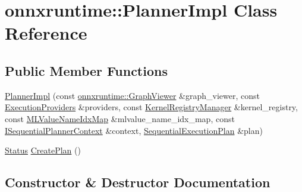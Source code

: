 \hypertarget{classonnxruntime_1_1PlannerImpl}{}\section{onnxruntime\+:\+:Planner\+Impl Class Reference}
\label{classonnxruntime_1_1PlannerImpl}
\subsection*{Public Member Functions}
\begin{DoxyCompactItemize}
\item 
\mbox{\hyperlink{classonnxruntime_1_1PlannerImpl_a1cde7a30b6a831d75664ca0908ac2beb}{Planner\+Impl}} (const \mbox{\hyperlink{classonnxruntime_1_1GraphViewer}{onnxruntime\+::\+Graph\+Viewer}} \&graph\+\_\+viewer, const \mbox{\hyperlink{classonnxruntime_1_1ExecutionProviders}{Execution\+Providers}} \&providers, const \mbox{\hyperlink{classonnxruntime_1_1KernelRegistryManager}{Kernel\+Registry\+Manager}} \&kernel\+\_\+registry, const \mbox{\hyperlink{classonnxruntime_1_1MLValueNameIdxMap}{M\+L\+Value\+Name\+Idx\+Map}} \&mlvalue\+\_\+name\+\_\+idx\+\_\+map, const \mbox{\hyperlink{classonnxruntime_1_1ISequentialPlannerContext}{I\+Sequential\+Planner\+Context}} \&context, \mbox{\hyperlink{structonnxruntime_1_1SequentialExecutionPlan}{Sequential\+Execution\+Plan}} \&plan)
\item 
\mbox{\hyperlink{classonnxruntime_1_1common_1_1Status}{Status}} \mbox{\hyperlink{classonnxruntime_1_1PlannerImpl_ac293990d1378b99bf4e6c0fcb8ee5a23}{Create\+Plan}} ()
\end{DoxyCompactItemize}


\subsection{Constructor \& Destructor Documentation}
\mbox{\label{classonnxruntime_1_1PlannerImpl_a1cde7a30b6a831d75664ca0908ac2beb}} 
